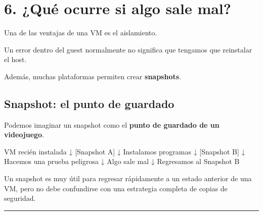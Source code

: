 \documentclass[
  spanish,
  letterpaper,
]{scrbook}
\newenvironment{Shaded}{\begin{snugshade}}{\end{snugshade}}
\newcommand{\NormalTok}[1]{\textcolor[rgb]{0.00,0.23,0.31}{#1}}
\begin{document}

\chapter{6. ¿Qué ocurre si algo sale
mal?}\label{quuxe9-ocurre-si-algo-sale-mal}

Una de las ventajas de una VM es el aislamiento.

Un error dentro del guest normalmente no significa que tengamos que
reinstalar el host.

Además, muchas plataformas permiten crear \textbf{snapshots}.

\section{Snapshot: el punto de
guardado}\label{snapshot-el-punto-de-guardado}

Podemos imaginar un snapshot como el \textbf{punto de guardado de un
videojuego}.

\begin{Shaded}
\begin{Highlighting}[]
\NormalTok{VM recién instalada}
\NormalTok{       ↓}
\NormalTok{[Snapshot A]}
\NormalTok{       ↓}
\NormalTok{Instalamos programas}
\NormalTok{       ↓}
\NormalTok{[Snapshot B]}
\NormalTok{       ↓}
\NormalTok{Hacemos una prueba peligrosa}
\NormalTok{       ↓}
\NormalTok{Algo sale mal}
\NormalTok{       ↓}
\NormalTok{Regresamos al Snapshot B}
\end{Highlighting}
\end{Shaded}

\begin{tcolorbox}[enhanced jigsaw, arc=.35mm, bottomrule=.15mm, bottomtitle=1mm, breakable, colback=white, colbacktitle=quarto-callout-warning-color!10!white, colframe=quarto-callout-warning-color-frame, coltitle=black, left=2mm, leftrule=.75mm, opacityback=0, opacitybacktitle=0.6, rightrule=.15mm, title=\textcolor{quarto-callout-warning-color}{\faExclamationTriangle}\hspace{0.5em}{Snapshot no significa backup completo}, titlerule=0mm, toprule=.15mm, toptitle=1mm]

Un snapshot es muy útil para regresar rápidamente a un estado anterior
de una VM, pero no debe confundirse con una estrategia completa de
copias de seguridad.

\end{tcolorbox}

\begin{center}\rule{0.5\linewidth}{0.5pt}\end{center}
\end{document}

